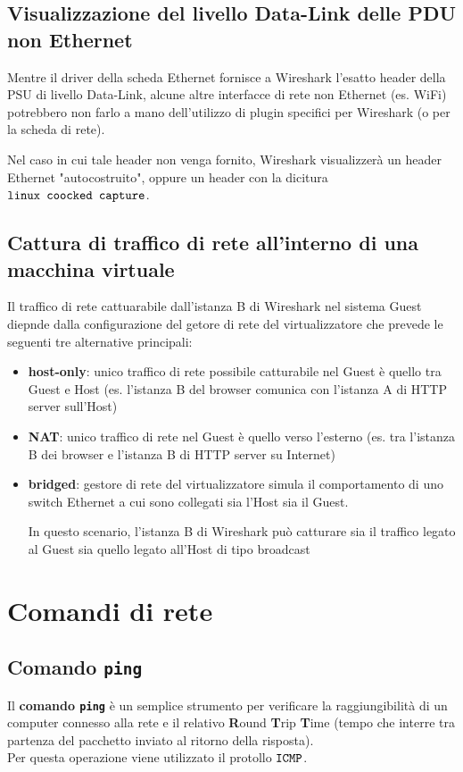 \documentclass[12pt, a4paper, oneside]{book}
\begin{document}
    \subsection{Visualizzazione del livello Data-Link delle PDU non Ethernet}
    Mentre il driver della scheda Ethernet fornisce a Wireshark l'esatto header della PSU di livello Data-Link, alcune altre interfacce di rete non Ethernet (es. WiFi) potrebbero non farlo a mano dell'utilizzo di plugin specifici per Wireshark (o per la scheda di rete).
    
    Nel caso in cui tale header non venga fornito, Wireshark visualizzerà un header Ethernet "autocostruito", oppure un header con la dicitura $\verb|linux coocked capture|$.

    \subsection{Cattura di traffico di rete all'interno di una macchina virtuale}

    Il traffico di rete cattuarabile dall'istanza B di Wireshark nel sistema Guest diepnde dalla configurazione del getore di rete del virtualizzatore che prevede le seguenti tre alternative principali:
    \begin{itemize}[label=$\triangleright$]
      \item \textbf{host-only}: unico traffico di rete possibile catturabile nel Guest è quello tra Guest e Host (es. l’istanza B del browser comunica con l’istanza A di HTTP server sull’Host)
      \smallskip
      \item \textbf{NAT}: unico traffico di rete nel Guest è quello verso l’esterno (es. tra l’istanza B dei browser e l’istanza B di HTTP server su Internet)
      \smallskip
      \item \textbf{bridged}: gestore di rete del virtualizzatore simula il comportamento di uno switch Ethernet a cui sono collegati sia l’Host sia il Guest.
      
      In questo scenario, l’istanza B di Wireshark può catturare sia il traffico legato al Guest sia quello legato all’Host di tipo broadcast
    \end{itemize}

    \section{Comandi di rete}

    \subsection{Comando \protect\texttt{ping}}
    Il \textcolor{azzurrino}{\textbf{comando \texttt{ping}}} è un semplice strumento per verificare la raggiungibilità di un computer connesso alla rete e il relativo \textbf{R}ound \textbf{T}rip \textbf{T}ime (tempo che interre tra partenza del pacchetto inviato al ritorno della risposta).\\[0.2ex]
    Per questa operazione viene utilizzato il protollo $\verb|ICMP|$.
\end{document}
